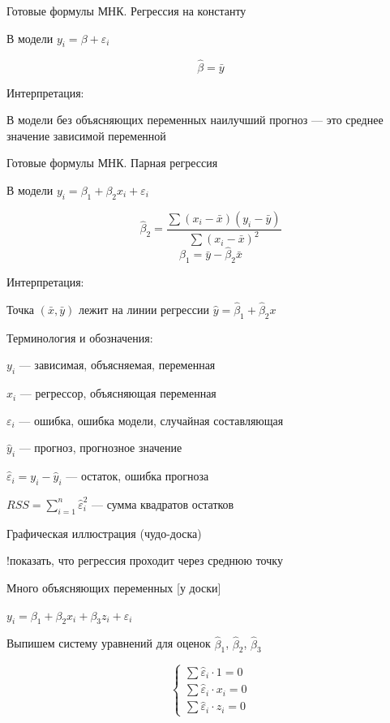\documentclass[ignorenonframetext,]{beamer}
\begin{document}
\begin{frame}{Готовые формулы МНК. Регрессия на константу}

В модели \(y_i=\beta +\varepsilon_i\)

\[
\hat{\beta}=\bar{y}
\]

Интерпретация:

В модели без объясняющих переменных наилучший прогноз --- это среднее
значение зависимой переменной

\end{frame}

\begin{frame}{Готовые формулы МНК. Парная регрессия}

В модели \(y_i=\beta_1+\beta_2 x_i +\varepsilon_i\)

\[
\hat{\beta}_2=\frac{\sum (x_i-\bar{x})(y_i-\bar{y})}{\sum (x_i-\bar{x})^2}
\] \[
\hat{\beta}_1=\bar{y}-\hat{\beta}_2\bar{x}
\]

Интерпретация:

Точка \((\bar{x},\bar{y})\) лежит на линии регрессии
\(\hat{y}=\hat{\beta}_1+\hat{\beta}_2 x\)

\end{frame}

\begin{frame}{Терминология и обозначения:}

\(y_i\) --- зависимая, объясняемая, переменная

\(x_i\) --- регрессор, объясняющая переменная

\(\varepsilon_i\) --- ошибка, ошибка модели, случайная составляющая

\(\hat{y}_i\) --- прогноз, прогнозное значение

\(\hat{\varepsilon}_i=y_i-\hat{y}_i\) --- остаток, ошибка прогноза

\(RSS=\sum_{i=1}^n \hat{\varepsilon}_i^2\) --- сумма квадратов остатков

\end{frame}

\begin{frame}{Графическая иллюстрация (чудо-доска)}

!показать, что регрессия проходит через среднюю точку

\end{frame}

\begin{frame}{Много объясняющих переменных {[}у доски{]}}

\(y_i=\beta_1+\beta_2 x_i +\beta_3 z_i+\varepsilon_i\)

Выпишем систему уравнений для оценок \(\hat{\beta}_1\),
\(\hat{\beta}_2\), \(\hat{\beta}_3\)

\[
\begin{cases}
\sum \hat{\varepsilon}_i \cdot 1 =0 \\
\sum \hat{\varepsilon}_i \cdot x_i =0 \\
\sum \hat{\varepsilon}_i \cdot z_i =0
\end{cases}
\]

\end{frame}
\end{document}
